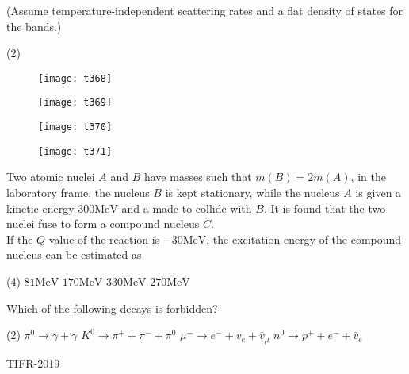 \begin{questions}
\begin{minipage}{\textwidth}
	(Assume temperature-independent scattering rates and a flat density of states for the bands.)
\end{minipage}
\begin{tasks}(2)
	\task[\textbf{A.}] \begin{figure}[H]
		\centering
		\texttt{[image: t368]}
	\end{figure}
	\task[\textbf{B.}] \begin{figure}[H]
		\centering
		\texttt{[image: t369]}
	\end{figure}
	\task[\textbf{C.}] \begin{figure}[H]
		\centering
		\texttt{[image: t370]}
	\end{figure}
	\task[\textbf{D.}] \begin{figure}[H]
		\centering
		\texttt{[image: t371]}
	\end{figure}
\end{tasks}
\begin{minipage}{\textwidth}
	\question Two atomic nuclei $A$ and $B$ have masses such that $m(B)=2 m(A)$, in the laboratory frame, the nucleus $B$ is kept stationary, while the nucleus $A$ is given a kinetic energy $300 \mathrm{MeV}$ and a made to collide with $B$. It is found that the two nuclei fuse to form a compound nucleus $C$.\\
	If the $Q$-value of the reaction is $-30 \mathrm{MeV}$, the excitation energy of the compound nucleus can be estimated as
\end{minipage}
\begin{tasks}(4)
	\task[\textbf{A.}] $81 \mathrm{MeV}$
	\task[\textbf{B.}]   $170 \mathrm{MeV}$
	\task[\textbf{C.}]   $330 \mathrm{MeV}$
	\task[\textbf{D.}] $270 \mathrm{MeV}$
\end{tasks}
\begin{minipage}{\textwidth}
	\question Which of the following decays is forbidden?
\end{minipage}
\begin{tasks}(2)
	\task[\textbf{A.}]   $\pi^{0} \rightarrow \gamma+\gamma$
	\task[\textbf{B.}] $K^{0} \rightarrow \pi^{+}+\pi^{-}+\pi^{0}$
	\task[\textbf{C.}] $\mu^{-} \rightarrow e^{-}+v_{e}+\bar{v}_{\mu}$
	\task[\textbf{D.}] $n^{0} \rightarrow p^{+}+e^{-}+\bar{v}_{e}$
\end{tasks}
\end{questions}
\begin{abox}
	TIFR-2019
\end{abox}
